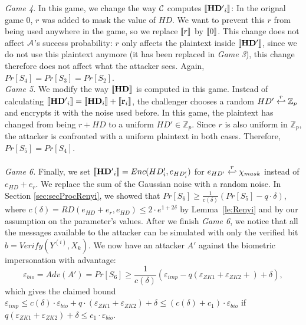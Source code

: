 \textit{Game 4.} In this game, we change the way $\mathcal{C}$ computes
$\left\llbracket\mathbf{HD'}_{i}\right\rrbracket$: In the orignal game 0, $r$ was added to mask the value
of $HD$. We want to prevent this $r$ from being used anywhere in the game, so we
replace $\left\llbracket r\right\rrbracket$ by $\left\llbracket0\right\rrbracket$. This change does not affect $\mathcal{A}$'s
success probability: $r$ only affects the plaintext inside $\left\llbracket\mathbf{HD'}\right\rrbracket$,
since we do not use this plaintext anymore (it has been replaced in \textit{Game
  3}), this
change therefore does not affect what the attacker sees. Again, $Pr[S_4] = Pr[S_3] = Pr[S_2]$.\\


\textit{Game 5.} We modify the way $\left\llbracket\mathbf{HD}\right\rrbracket$ is computed in this game. Instead
of calculating
$\left\llbracket\mathbf{HD'}_{i}\right\rrbracket = \left\llbracket\mathbf{HD}_{i}\right\rrbracket + \left\llbracket\mathbf{r}_{i}\right\rrbracket$, the
challenger chooses a random $HD' \stackrel{r}{\hookleftarrow} \mathbb{Z}_p$ and encrypts it
with the noise used before. In this game, the plaintext has changed from being
$r + HD$ to a uniform $HD' \in \mathbb{Z}_p$.  Since $r$ is also uniform in
$\mathbb{Z}_p$, the attacker is confronted with a uniform
plaintext in both cases. Therefore, $Pr[S_5] = Pr[S_4]$.
\\\\
\textit{Game 6.} Finally, we set $\left\llbracket\mathbf{HD'}_{i}\right\rrbracket = Enc(HD'_{i}, e_{HD'_{i}})$ for
$e_{HD'} \stackrel{r}{\hookleftarrow} \chi_{mask}$ instead of $e_{HD} + e_{r}$. We replace
the sum of the Gaussian noise with a random noise. In Section \ref{sec:secProcRenyi},
we showed that $Pr[S_6] \geq \frac{1}{c(\delta)}(Pr[S_5]-q \cdot \delta)$, where
$c(\delta) = RD(e_{HD} + e_{r}, e_{HD}) \leq 2 \cdot e^{1+2\delta}$ by
Lemma~\ref{le:Renyi} and by our assumption on the parameter's values. After we
finish \textit{Game 6}, we notice that all the messages available to the
attacker can be simulated with only the verified bit $b = Verify(Y^{(i)},
X_k)$. We now have an attacker $A'$ against the biometric impersonation with
advantage:
\[
\varepsilon_{bio} = Adv(A') = Pr[S_6] \geq \frac{1}{c(\delta)}(\varepsilon_{imp} - q(\varepsilon_{ZK1}+\varepsilon_{ZK2} +) + \delta),
\]
which gives the claimed bound $\varepsilon_{imp} \leq c(\delta) \cdot \varepsilon_{bio} + q \cdot (\varepsilon_{ZK1}+\varepsilon_{ZK2}) + \delta \leq (c(\delta)+c_1) \cdot \varepsilon_{bio}$ if $q(\varepsilon_{ZK1}+\varepsilon_{ZK2}) + \delta \leq c_1 \cdot \varepsilon_{bio}$.

